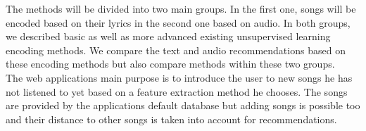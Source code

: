 The methods will be divided into two main groups. In the first one, songs will be encoded based on their lyrics in the second one based on audio. In both groups, we described basic as well as more advanced existing unsupervised learning encoding methods. We compare the text and audio recommendations based on these encoding methods but also compare methods within these two groups. \\
The web applications main purpose is to introduce the user to new songs he has not listened to yet based on a feature extraction method he chooses. The songs are provided by the applications default database but adding songs is possible too and their distance to other songs is taken into account for recommendations. \\


